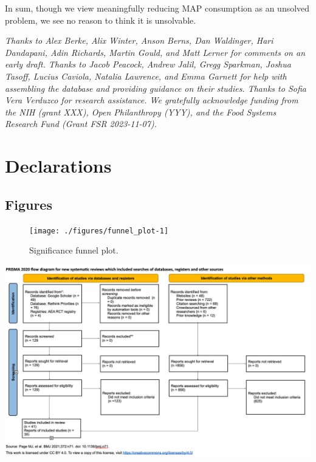 \documentclass[sn-nature,referee,pdflatex]{sn-jnl}
\begin{document}
In sum, though we view meaningfully reducing MAP consumption as an
unsolved problem, we see no reason to think it is unsolvable.


\emph{Thanks to Alex Berke, Alix Winter, Anson Berns, Dan Waldinger,
Hari Dandapani, Adin Richards, Martin Gould, and Matt Lerner for
comments on an early draft. Thanks to Jacob Peacock, Andrew Jalil, Gregg
Sparkman, Joshua Tasoff, Lucius Caviola, Natalia Lawrence, and Emma
Garnett for help with assembling the database and providing guidance on
their studies. Thanks to Sofia Vera Verduzco for research assistance. We
gratefully acknowledge funding from the NIH (grant XXX), Open
Philanthropy (YYY), and the Food Systems Research Fund (Grant FSR
2023-11-07).}

\section*{Declarations}\label{declarations}

\newpage

\clearpage

\subsection{Figures}\label{figures}

\begin{figure}[H]

{\centering \texttt{[image: ./figures/funnel\_plot-1]} 

}

\caption{Significance funnel plot.}\label{fig:funnel_plot}
\end{figure}

\begin{center}\includegraphics[width=1.2\linewidth,]{./figures/prisma-diagram} \end{center}
\end{document}
